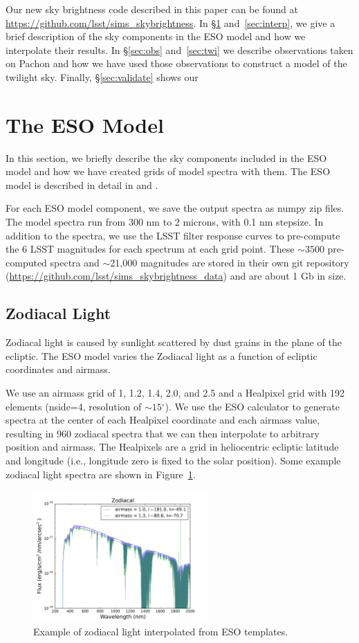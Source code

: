 \documentclass[]{spie}
\newcommand\degree{{^\circ}}
\begin{document}
Our new sky brightness code described in this paper can be found at \url{https://github.com/lsst/sims\_skybrightness}. In \S\ref{sec:eso} and~\ref{sec:interp}, we give a brief description of the sky components in the ESO model and how we interpolate their results. In \S\ref{sec:obs} and~\ref{sec:twi} we describe observations taken on Pachon and how we have used those observations to construct a model of the twilight sky.  Finally, \S\ref{sec:validate} shows our 

\section{The ESO Model}\label{sec:eso}
In this section, we briefly describe the sky components included in the ESO model and how we have created grids of model spectra with them. The ESO model is described in detail in \cite{Noll12} and \cite{Jones13}.

For each ESO model component, we save the output spectra as numpy zip files.  The model spectra run from 300 nm to 2 microns, with 0.1 nm stepsize.  In addition to the spectra, we use the LSST filter response curves to pre-compute the 6 LSST magnitudes for each spectrum at each grid point. These $\sim3500$ pre-computed spectra and $\sim$21,000 magnitudes are stored in their own git repository (\url{https://github.com/lsst/sims\_skybrightness\_data}) and are about 1 Gb in size.

\subsection{Zodiacal Light}
Zodiacal light is caused by sunlight scattered by dust grains in the plane of the ecliptic.  The ESO model varies the Zodiacal light as a function of ecliptic coordinates and airmass.  

We use an airmass grid of 1, 1.2, 1.4, 2.0, and 2.5 and a Healpixel \cite{Gorski99} grid with 192 elements (nside=4, resolution of $\sim15\degree$).  We use the ESO calculator to generate spectra at the center of each Healpixel coordinate and each airmass value, resulting in 960 zodiacal spectra that we can then interpolate to arbitrary position and airmass.  The Healpixels are a grid in heliocentric ecliptic latitude and longitude (i.e., longitude zero is fixed to the solar position).  Some example zodiacal light spectra are shown in Figure~\ref{fig:zodiacal}. 


\begin{figure}
  \includegraphics[height=5cm]{plots/zodiacal.pdf}
  \caption{Example of zodiacal light interpolated from ESO templates. \label{fig:zodiacal}}
\end{figure}
\end{document}
